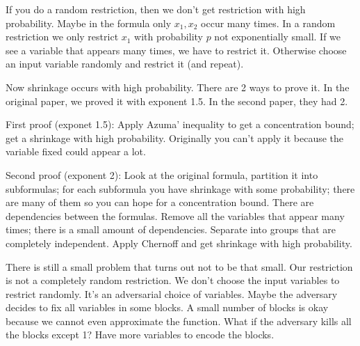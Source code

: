 If you do a random restriction, then we don't get restriction with high probability. Maybe in the formula only $x_1,x_2$ occur many times. In a random restriction we only restrict $x_1$ with probability $p$ not exponentially small. If we see a variable that appears many times, we have to restrict it. Otherwise choose an input variable randomly and restrict it (and repeat).

Now shrinkage occurs with high probability. There are 2 ways to prove it. 
In the original paper, we proved it with exponent 1.5. In the second paper, they had 2. %


First proof (exponet 1.5): Apply Azuma' inequality to get a concentration bound; get a shrinkage with high probability.
Originally you can't apply it because the variable fixed could appear a lot.

Second proof (exponent 2): Look at the original formula, partition it into subformulas; for each subformula you have shrinkage with some probability; there are many of them so you can hope for a concentration bound. There are dependencies between the formulas. Remove all the variables that appear many times; there is a small amount of dependencies. Separate into groups that are completely independent. Apply Chernoff and get shrinkage with high probability. %


There is still a small problem that turns out not to be that small. Our restriction is not a completely random restriction. We don't choose the input variables to restrict randomly. It's an adversarial choice of variables. %
Maybe the adversary decides to fix all variables in some blocks.
A small number of blocks is okay because we cannot even approximate the function. What if the adversary kills all the blocks except 1? Have more variables to encode the blocks. 

